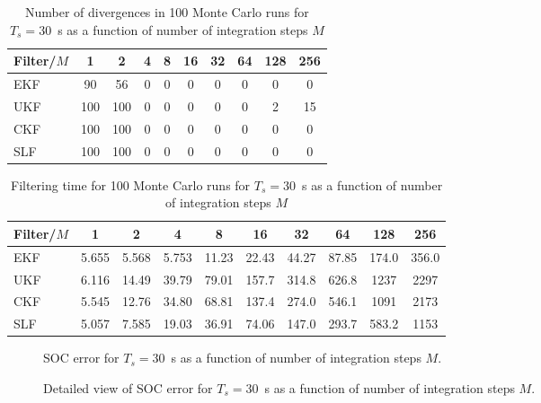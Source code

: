 \documentclass[../zhang_thesis.tex]{subfiles}
\begin{document}
\clearpage

\begin{table}[h]
\centering
\caption{Number of divergences in 100 Monte Carlo runs for $T_s=30$~s as a function of number of integration steps $M$}
\begin{tabular}{@{}l*{9}{c}@{}}
\toprule
Filter/$M$ & 1   & 2   & 4 & 8 & 16 & 32 & 64 & 128 & 256 \\
\midrule
EKF        & 90  & 56  & 0 & 0 & 0  & 0  & 0  & 0   & 0   \\
UKF        & 100 & 100 & 0 & 0 & 0  & 0  & 0  & 2   & 15  \\
CKF        & 100 & 100 & 0 & 0 & 0  & 0  & 0  & 0   & 0   \\
SLF        & 100 & 100 & 0 & 0 & 0  & 0  & 0  & 0   & 0   \\
\bottomrule
\end{tabular}
\label{tab:div_30}
\end{table}

\begin{table}[h]
\centering
\caption{Filtering time for 100 Monte Carlo runs for $T_s=30$~s as a function of number of integration steps $M$}
\begin{tabular}{@{}lccccccccc@{}}
\toprule
Filter/$M$ & 1     & 2     & 4     & 8     & 16    & 32    & 64    & 128   & 256   \\ \midrule
EKF        & 5.655 & 5.568 & 5.753 & 11.23 & 22.43 & 44.27 & 87.85 & 174.0 & 356.0 \\
UKF        & 6.116 & 14.49 & 39.79 & 79.01 & 157.7 & 314.8 & 626.8 & 1237  & 2297  \\
CKF        & 5.545 & 12.76 & 34.80 & 68.81 & 137.4 & 274.0 & 546.1 & 1091  & 2173  \\
SLF        & 5.057 & 7.585 & 19.03 & 36.91 & 74.06 & 147.0 & 293.7 & 583.2 & 1153  \\ \bottomrule
\end{tabular}
\label{tab:time_30}
\end{table}

\clearpage

\begin{figure}[p]
\centering

\caption{SOC error for $T_s=30$~s as a function of number of integration steps $M$.}
\label{fig:mrmse_30}
\end{figure}

\begin{figure}[p]
\centering

\caption{Detailed view of SOC error for $T_s=30$~s as a function of number of integration steps $M$.}
\label{fig:mrmse_det_30}
\end{figure}
\end{document}
